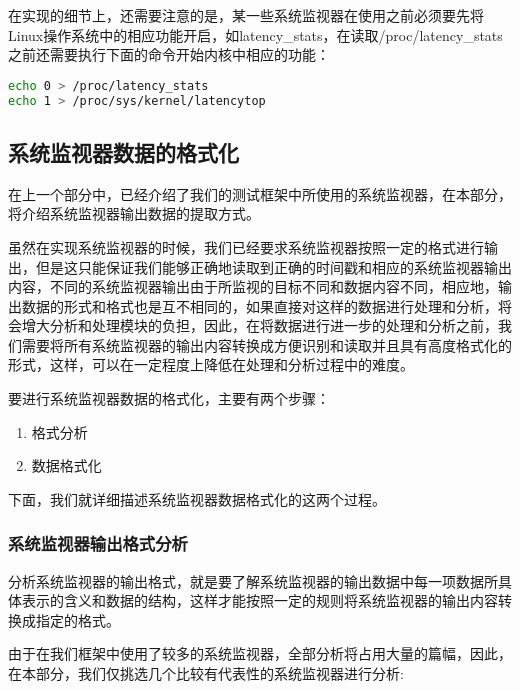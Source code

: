 在实现的细节上，还需要注意的是，某一些系统监视器在使用之前必须要先将Linux操作系统中的相应功能开启，如latency\_stats，在读取/proc/latency\_stats之前还需要执行下面的命令开始内核中相应的功能：

\begin{lstlisting}[language=bash]
echo 0 > /proc/latency_stats
echo 1 > /proc/sys/kernel/latencytop
\end{lstlisting}

\subsection{系统监视器数据的格式化}

在上一个部分中，已经介绍了我们的测试框架中所使用的系统监视器，在本部分，将介绍系统监视器输出数据的提取方式。

虽然在实现系统监视器的时候，我们已经要求系统监视器按照一定的格式进行输出，但是这只能保证我们能够正确地读取到正确的时间戳和相应的系统监视器输出内容，不同的系统监视器输出由于所监视的目标不同和数据内容不同，相应地，输出数据的形式和格式也是互不相同的，如果直接对这样的数据进行处理和分析，将会增大分析和处理模块的负担，因此，在将数据进行进一步的处理和分析之前，我们需要将所有系统监视器的输出内容转换成方便识别和读取并且具有高度格式化的形式，这样，可以在一定程度上降低在处理和分析过程中的难度。

要进行系统监视器数据的格式化，主要有两个步骤：
\begin{enumerate}
\item 格式分析
\item 数据格式化
\end{enumerate}

下面，我们就详细描述系统监视器数据格式化的这两个过程。

\subsubsection{系统监视器输出格式分析}
分析系统监视器的输出格式，就是要了解系统监视器的输出数据中每一项数据所具体表示的含义和数据的结构，这样才能按照一定的规则将系统监视器的输出内容转换成指定的格式。

由于在我们框架中使用了较多的系统监视器，全部分析将占用大量的篇幅，因此，在本部分，我们仅挑选几个比较有代表性的系统监视器进行分析:

